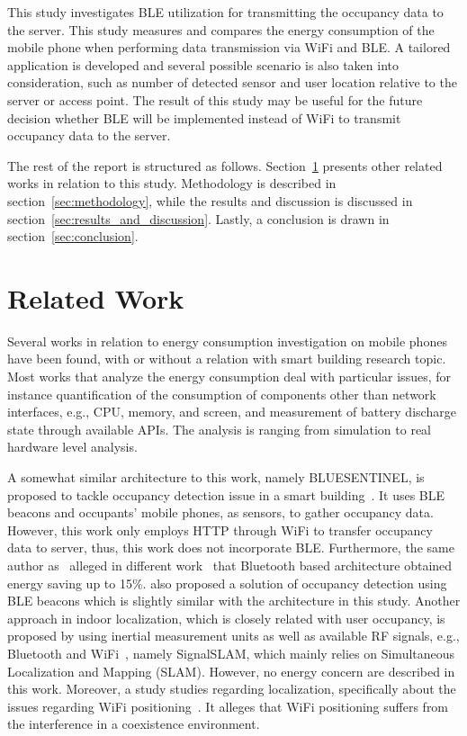 \documentclass[journal]{vgtc}                %
\begin{document}
This study investigates BLE utilization for transmitting the occupancy data to the server. This study measures and compares the energy consumption of the mobile phone when performing data transmission via WiFi and BLE. A tailored application is developed and several possible scenario is also taken into consideration, such as number of detected sensor and user location relative to the server or access point. The result of this study may be useful for the future decision whether BLE will be implemented instead of WiFi to transmit occupancy data to the server.

The rest of the report is structured as follows. Section~\ref{sec:related_work} presents other related works in relation to this study. Methodology is described in section~\ref{sec:methodology}, while the results and discussion is discussed in section~\ref{sec:results_and_discussion}. Lastly, a conclusion is drawn in section~\ref{sec:conclusion}.

\section{Related Work} %
\label{sec:related_work}
Several works in relation to energy consumption investigation on mobile phones have been found, with or without a relation with smart building research topic. Most works that analyze the energy consumption deal with particular issues, for instance quantification of the consumption of components other than network interfaces, e.g., CPU, memory, and screen, and measurement of battery discharge state through available APIs. The analysis is ranging from simulation to real hardware level analysis.

A somewhat similar architecture to this work, namely BLUESENTINEL, is proposed to tackle occupancy detection issue in a smart building~\cite{Conte2014}. It uses BLE beacons and occupants' mobile phones, as sensors, to gather occupancy data. However, this work only employs HTTP through WiFi to transfer occupancy data to server, thus, this work does not incorporate BLE. Furthermore, the same author as~\cite{Conte2014} alleged in different work~\cite{Corna2015} that Bluetooth based architecture obtained energy saving up to 15\%. \cite{Corna2015} also proposed a solution of occupancy detection using BLE beacons which is slightly similar with the architecture in this study. Another approach in indoor localization, which is closely related with user occupancy, is proposed by using inertial measurement units as well as available RF signals, e.g., Bluetooth and WiFi~\cite{Mirowski2013}, namely SignalSLAM, which mainly relies on Simultaneous Localization and Mapping (SLAM). However, no energy concern are described in this work. Moreover, a study studies regarding localization, specifically about the issues regarding WiFi positioning~\cite{Pei2012}. It alleges that WiFi positioning suffers from the interference in a coexistence environment.
\end{document}

